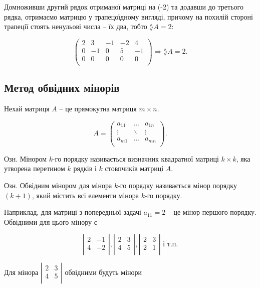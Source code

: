 Домноживши другий рядок отриманої матриці на (-2) та додавши до третього
рядка, отримаємо матрицю у трапецоїдному вигляді, причому на похилій стороні
трапеції стоять ненульові числа -- їх два, тобто $\rang A = 2$:

$$\begin{pmatrix}
	2 &  3 & -1 & -2 &  4 \\
	0 & -1 &  0 &  5 & -1 \\
	0 &  0 &  0 &  0 &  0 \\
\end{pmatrix} \Rightarrow \rang A = 2.$$

\subsection{Метод обвідних мінорів}

Нехай матриця $A$ -- це прямокутна матриця $m \times n$.

$$A = \begin{pmatrix}
	a_{11} & ...    & a_{1n} \\
	\vdots & \ddots & \vdots \\
	a_{m1} & ...    & a_{mn} \\
\end{pmatrix}.$$


Озн. Мінором $k$-го порядку називається визначник квадратної матриці $k \times k$,
яка утворена перетином $k$ рядків і $k$ стовпчиків матриці $A$.


Озн. Обвідним мінором для мінора $k$-го порядку називається мінор порядку
$(k + 1)$, який містить всі елементи мінора $k$-го порядку.


Наприклад, для матриці з попередньої задачі $a_{11} = 2$ – це мінор першого
порядку. Обвідними для цього мінору є

$$\left| \begin{matrix}
	2 & -1 \\
	4 & -2 \\
\end{matrix} \right|, \left| \begin{matrix}
	2 & 3 \\
	4 & 5 \\
\end{matrix} \right|, \left| \begin{matrix}
	2 & 3 \\
	2 & 1 \\
\end{matrix} \right| \text{ і т.п.}$$


Для мінора $\left| \begin{matrix}
	2 & 3 \\
	4 & 5 \\
\end{matrix} \right|$ обвідними будуть мінори

